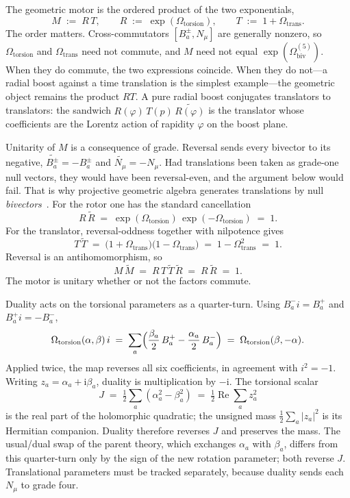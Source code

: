 \documentclass[a4paper]{article}
\begin{document}
The geometric motor is the ordered product of the two exponentials,
\[
M \;:=\; R\,T,
\qquad
R \;:=\; \exp(\Omega_{\mathrm{torsion}}),\qquad
T \;:=\; 1+\Omega_{\mathrm{trans}}.
\]
The order matters. Cross-commutators \([B_{a}^{\pm},N_{\mu}]\) are generally nonzero, so \(\Omega_{\mathrm{torsion}}\) and \(\Omega_{\mathrm{trans}}\) need not commute, and \(M\) need not equal \(\exp(\Omega_{\mathrm{biv}}^{(5)})\). When they do commute, the two expressions coincide. When they do not---a radial boost against a time translation is the simplest example---the geometric object remains the product \(RT\). A pure radial boost conjugates translators to translators: the sandwich \(R(\varphi)\,T(p)\,\widetilde{R(\varphi)}\) is the translator whose coefficients are the Lorentz action of rapidity \(\varphi\) on the boost plane.

Unitarity of \(M\) is a consequence of grade. Reversal sends every bivector to its negative, \(\widetilde{B_{a}^{\pm}}=-B_{a}^{\pm}\) and \(\widetilde{N_{\mu}}=-N_{\mu}\). Had translations been taken as grade-one null vectors, they would have been reversal-even, and the argument below would fail. That is why projective geometric algebra generates translations by null \emph{bivectors}~\cite{Gunn2017,Lengyel2024,GunnDeKeninck2019}. For the rotor one has the standard cancellation
\[
R\,\widetilde{R}
\;=\;
\exp(\Omega_{\mathrm{torsion}})\,\exp(-\Omega_{\mathrm{torsion}})
\;=\; 1.
\]
For the translator, reversal-oddness together with nilpotence gives
\[
T\,\widetilde{T}
\;=\;
\bigl(1+\Omega_{\mathrm{trans}}\bigr)\bigl(1-\Omega_{\mathrm{trans}}\bigr)
\;=\;
1-\Omega_{\mathrm{trans}}^{2}
\;=\; 1.
\]
Reversal is an antihomomorphism, so
\[
M\,\widetilde{M}
\;=\;
R\,T\,\widetilde{T}\,\widetilde{R}
\;=\;
R\,\widetilde{R}
\;=\; 1.
\]
The motor is unitary whether or not the factors commute.

Duality acts on the torsional parameters as a quarter-turn. Using \(B^{-}_{a}i=B^{+}_{a}\) and \(B^{+}_{a}i=-B^{-}_{a}\),
\[
\Omega_{\mathrm{torsion}}(\alpha,\beta)\,i
\;=\;
\sum_{a}\Bigl(\frac{\beta_{a}}{2}\,B^{+}_{a}-\frac{\alpha_{a}}{2}\,B^{-}_{a}\Bigr)
\;=\;
\Omega_{\mathrm{torsion}}(\beta,-\alpha).
\]
Applied twice, the map reverses all six coefficients, in agreement with \(i^{2}=-1\). Writing \(z_{a}=\alpha_{a}+\mathrm{i}\beta_{a}\), duality is multiplication by \(-\mathrm{i}\). The torsional scalar
\[
J \;=\; \tfrac12\sum_{a}(\alpha_{a}^{2}-\beta_{a}^{2}) \;=\; \tfrac12\operatorname{Re}\sum_{a}z_{a}^{2}
\]
is the real part of the holomorphic quadratic; the unsigned mass \(\tfrac12\sum_{a}|z_{a}|^{2}\) is its Hermitian companion. Duality therefore reverses \(J\) and preserves the mass. The usual/dual swap of the parent theory, which exchanges \(\alpha_{a}\) with \(\beta_{a}\), differs from this quarter-turn only by the sign of the new rotation parameter; both reverse \(J\). Translational parameters must be tracked separately, because duality sends each \(N_{\mu}\) to grade four.
\end{document}
